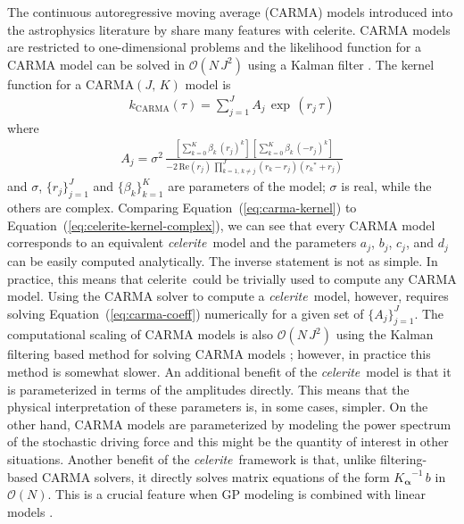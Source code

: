 \documentclass[manuscript, letterpaper]{aastex6}
\newcommand{\project}[1]{\textsf{#1}}
\newcommand{\celerite}{\project{celerite}}
\newcommand{\celeriteterm}{\emph{celerite}}
\renewcommand{\eqref}[1]{\ref{eq:#1}}
\newcommand{\Eq}[1]{Equation~(\eqref{#1})}
\newcommand{\eq}[1]{\Eq{#1}}
\newcommand{\eqlabel}[1]{\label{eq:#1}}
\newcommand{\bvec}[1]{{\ensuremath{\boldsymbol{#1}}}}
\begin{document}
The continuous autoregressive moving average (CARMA) models introduced into
the astrophysics literature by \citet{Kelly:2014} share many features with
\celerite.
CARMA models are restricted to one-dimensional problems and the likelihood
function for a CARMA model can be solved in $\mathcal{O}(N\,J^2)$ using a
Kalman filter \citep{Kelly:2014}.
The kernel function for a CARMA$(J,\,K)$ model is
\begin{eqnarray}\eqlabel{carma-kernel}
k_\mathrm{CARMA}(\tau) = \sum_{j=1}^J A_j\,\exp\,(r_j\,\tau)
\end{eqnarray}
where
\begin{eqnarray}\eqlabel{carma-coeff}
A_j = \sigma^2 \,\frac{\left[\sum_{k=0}^K\beta_k\,{(r_j)}^k\right]\,
    \left[\sum_{k=0}^K\beta_k\,{(-r_j)}^k\right]}
    {-2\,\mathrm{Re}(r_j)\,\prod_{k=1,\,k \ne j}^{J}(r_k-r_j)({r_k}^*+r_j)}
\end{eqnarray}
and $\sigma$, $\{r_j\}_{j=1}^J$ and $\{\beta_k\}_{k=1}^K$ are parameters of
the model; $\sigma$ is real, while the others are complex.
Comparing \eq{carma-kernel} to \eq{celerite-kernel-complex}, we can see that
every CARMA model corresponds to an equivalent \celeriteterm\ model and the
parameters $a_j$, $b_j$, $c_j$, and $d_j$ can be easily computed analytically.
The inverse statement is not as simple.
In practice, this means that \celerite\ could be trivially used to compute any
CARMA model.
Using the CARMA solver to compute a \celeriteterm\ model, however, requires
solving \eq{carma-coeff} numerically for a given set of $\{A_j\}_{j=1}^J$.
The computational scaling of CARMA models is also $\mathcal{O}(N\,J^2)$ using
the Kalman filtering based method for solving CARMA models \citep{Kelly:2014};
however, in practice this method is somewhat slower.
An additional benefit of the \celeriteterm\ model is that it is parameterized in terms
of the amplitudes directly.
This means that the physical interpretation of these parameters is, in some
cases, simpler.
On the other hand, CARMA models are parameterized by modeling the power
spectrum of the stochastic driving force and this might be the quantity of
interest in other situations.
Another benefit of the \celeriteterm\ framework is that, unlike
filtering-based CARMA solvers, it directly solves matrix equations of the form
${K_\bvec{\alpha}}^{-1}\,b$ in $\mathcal{O}(N)$.
This is a crucial feature when GP modeling is combined with linear models
\citep[for example][]{Luger:2017}.
\end{document}
